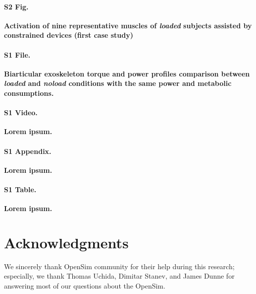 \documentclass[10pt,letterpaper]{article}
\begin{document}
\paragraph*{S2 Fig.}
\label{S2_Fig}
{\bf Activation of nine representative muscles of {\it loaded} subjects assisted by constrained devices (first case study)}

\paragraph*{S1 File.}
\label{S1_File}
{\bf Biarticular exoskeleton torque and power profiles comparison between {\it loaded} and {\it noload} conditions with the same power and metabolic consumptions.}

\paragraph*{S1 Video.}
\label{S1_Video}
{\bf Lorem ipsum.}

\paragraph*{S1 Appendix.}
\label{S1_Appendix}
{\bf Lorem ipsum.}

\paragraph*{S1 Table.}
\label{S1_Table}
{\bf Lorem ipsum.}

\section*{\textbf{Acknowledgments}}
We sincerely thank OpenSim community for their help during this research; especially, we thank Thomas Uchida, Dimitar Stanev, and James Dunne for answering most of our questions about the OpenSim.

\nolinenumbers

%
%
% 


\end{document}
